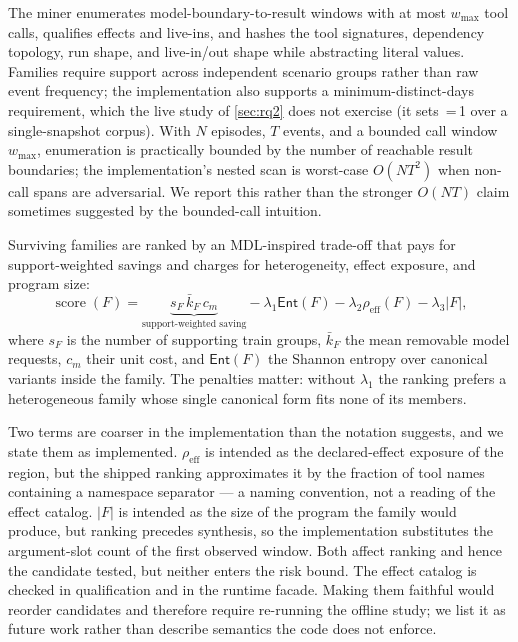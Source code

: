 The miner enumerates model-boundary-to-result windows with at most $w_{\max}$ tool calls,
qualifies effects and live-ins, and hashes the tool signatures, dependency topology,
run shape, and live-in/out shape while abstracting literal values.  Families require
support across independent scenario groups rather than raw event frequency; the
implementation also supports a minimum-distinct-days requirement, which the live study of
\cref{sec:rq2} does not exercise (it sets \,=\,1 over a single-snapshot
corpus).  With $N$ episodes, $T$ events,
and a bounded call window $w_{\max}$, enumeration is practically bounded by the number of
reachable result boundaries; the implementation's nested scan is worst-case $O(NT^2)$
when non-call spans are adversarial.  We report this rather than the stronger $O(NT)$
claim sometimes suggested by the bounded-call intuition.

Surviving families are ranked by an MDL-inspired trade-off that pays for
support-weighted savings and charges for heterogeneity, effect exposure, and program size:
\begin{equation}
  \operatorname{score}(F)=\underbrace{s_F\,\bar{k}_F\,c_m}_{\text{support-weighted saving}}
  -\lambda_1 \mathsf{Ent}(F)-\lambda_2\rho_{\mathrm{eff}}(F)-\lambda_3|F|,
  \label{eq:score}
\end{equation}
where $s_F$ is the number of supporting train groups, $\bar{k}_F$ the mean removable model
requests, $c_m$ their unit cost, and $\mathsf{Ent}(F)$ the Shannon entropy over canonical
variants inside the family.  The penalties matter: without $\lambda_1$ the ranking prefers a heterogeneous
family whose single canonical form fits none of its members.

Two terms are coarser in the implementation than the notation suggests, and we state them
as implemented.  $\rho_{\mathrm{eff}}$ is intended as the declared-effect exposure of the
region, but the shipped ranking approximates it by the fraction of tool names containing a
namespace separator --- a naming convention, not a reading of the effect catalog.  $|F|$ is
intended as the size of the program the family would produce, but ranking precedes
synthesis, so the implementation substitutes the argument-slot count of the first observed
window. Both affect ranking and hence the candidate tested, but neither enters
the risk bound. The effect catalog is checked in qualification and in the runtime facade.  Making them faithful would reorder candidates and therefore
require re-running the offline study; we list it as future work rather than describe
semantics the code does not enforce.

